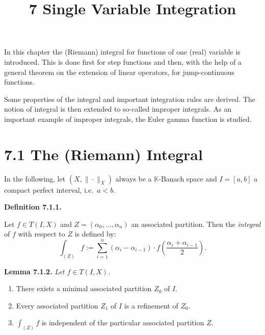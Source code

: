 \documentclass[12pt]{article}
\title{7 Single Variable Integration}
\date{}
\newenvironment{definition}[1]{%
  \par\vspace{6pt}\noindent\textbf{Definition #1.}\itshape\space
}{%
  \par\vspace{6pt}
}
\begin{document}
\maketitle

In this chapter the (Riemann) integral for functions of one (real) variable is introduced.
This is done first for step functions and then, with the help of a general theorem on the
extension of linear operators, for jump-continuous functions.

Some properties of the integral and important integration rules are derived.
The notion of integral is then extended to so-called improper integrals. As an important
example of improper integrals, the Euler gamma function is studied.

\section{7.1 The (Riemann) Integral}

In the following, let $(X,\|\cdot\|_X)$ always be a $\mathbb K$-Banach space and $I=[a,b]$ a compact perfect
interval, i.e.\ $a<b$.

\begin{definition}{7.1.1}
Let $f\in T(I,X)$ and $Z=(\alpha_0,\ldots,\alpha_n)$ an associated partition. Then
the \emph{integral} of $f$ with respect to $Z$ is defined by:
\[
\int_{(Z)} f
:=\sum_{i=1}^{n}(\alpha_i-\alpha_{i-1})\cdot f\!\left(\frac{\alpha_i+\alpha_{i-1}}{2}\right).
\]
\end{definition}

\par\vspace{6pt}\noindent\textbf{Lemma 7.1.2.}\itshape\space
Let $f\in T(I,X)$.
\begin{enumerate}
    \item There exists a minimal associated partition $Z_0$ of $I$.
    \item Every associated partition $Z_1$ of $I$ is a refinement of $Z_0$.
    \item $\int_{(Z)} f$ is independent of the particular associated partition $Z$.
\end{enumerate}
\upshape
\end{document}
